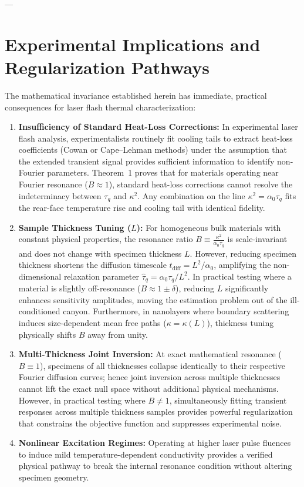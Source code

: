 \documentclass[review,12pt]{article}
\begin{document}
---

\section{Experimental Implications and Regularization Pathways}

The mathematical invariance established herein has immediate, practical consequences for laser flash thermal characterization:

\begin{enumerate}
    \item \textbf{Insufficiency of Standard Heat-Loss Corrections:} In experimental laser flash analysis, experimentalists routinely fit cooling tails to extract heat-loss coefficients (Cowan or Cape--Lehman methods) under the assumption that the extended transient signal provides sufficient information to identify non-Fourier parameters. Theorem~1 proves that for materials operating near Fourier resonance ($B \approx 1$), standard heat-loss corrections cannot resolve the indeterminacy between $\tau_q$ and $\kappa^2$. Any combination on the line $\kappa^2 = \alpha_0 \tau_q$ fits the rear-face temperature rise and cooling tail with identical fidelity.
    \item \textbf{Sample Thickness Tuning ($L$):} For homogeneous bulk materials with constant physical properties, the resonance ratio $B \equiv \frac{\kappa^2}{\alpha_0 \tau_q}$ is scale-invariant and does not change with specimen thickness $L$. However, reducing specimen thickness shortens the diffusion timescale $t_{\mathrm{diff}} = L^2 / \alpha_0$, amplifying the non-dimensional relaxation parameter $\hat{\tau}_q = \alpha_0 \tau_q / L^2$. In practical testing where a material is slightly off-resonance ($B \approx 1 \pm \delta$), reducing $L$ significantly enhances sensitivity amplitudes, moving the estimation problem out of the ill-conditioned canyon. Furthermore, in nanolayers where boundary scattering induces size-dependent mean free paths ($\kappa = \kappa(L)$), thickness tuning physically shifts $B$ away from unity.
    \item \textbf{Multi-Thickness Joint Inversion:} At exact mathematical resonance ($B \equiv 1$), specimens of all thicknesses collapse identically to their respective Fourier diffusion curves; hence joint inversion across multiple thicknesses cannot lift the exact null space without additional physical mechanisms. However, in practical testing where $B \ne 1$, simultaneously fitting transient responses across multiple thickness samples provides powerful regularization that constrains the objective function and suppresses experimental noise.
    \item \textbf{Nonlinear Excitation Regimes:} Operating at higher laser pulse fluences to induce mild temperature-dependent conductivity provides a verified physical pathway to break the internal resonance condition without altering specimen geometry.
\end{enumerate}
\end{document}
